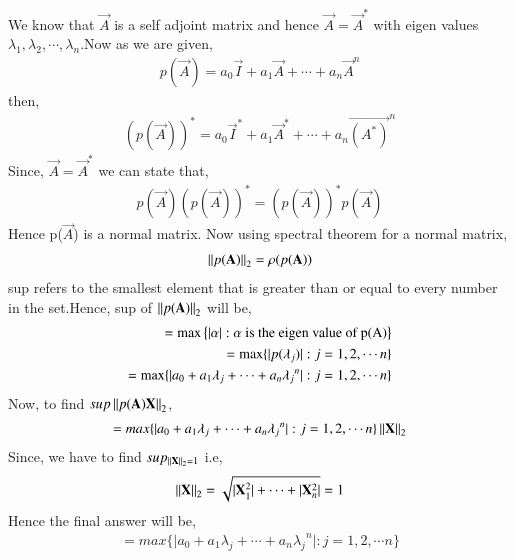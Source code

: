 We know that $\vec{A}$ is a self adjoint matrix and hence $\vec{A}=\vec{A}^{*}$ with eigen values $\lambda_1,\lambda_2,\cdots,\lambda_n$.Now as we are given,
\begin{align}
p(\vec{A})=a_0\vec{I}+a_1\vec{A}+\cdots+a_n\vec{A}^n
\end{align}
then,
\begin{align}
(p(\vec{A}))^{*}=a_0\vec{I}^{*}+a_1\vec{A}^{*}+\cdots+a_n\vec{(A^{*})}^n
\end{align}
Since, $\vec{A}=\vec{A}^{*}$ we can state that,
\begin{align}
p(\vec{A})(p(\vec{A}))^{*}=(p(\vec{A}))^{*}p(\vec{A})
\end{align}
Hence p($\vec{A}$) is a normal matrix. Now using spectral theorem for a normal matrix,
\begin{align}
\left\lVert p(\mathbf{A})\right\rVert_{2}=\rho{(p(\mathbf{A}))}\end{align}
sup refers to the smallest element that is greater than or equal to every number in the set.Hence, sup of $\left\lVert p(\mathbf{A})\right\rVert_{2}$ will be, 
\begin{align}
=\max\left\{\vert\alpha\vert: \alpha \text{ is the eigen value of p(A)}\right\}\\
=\max\{\vert p(\lambda_j)\vert:j=1, 2, \cdots n\}\\
=\max\{\vert a_0+a_1\lambda_j+\cdots+a_n{\lambda_j}^n\vert: j=1, 2, \cdots n\}
\end{align}
Now, to find $sup\left\lVert p(\mathbf{A})\mathbf{X}\right\rVert_{2}$,\begin{align}
=max\{\vert a_0+a_1\lambda_j+\cdots+a_n{\lambda_j}^n\vert: j=1, 2, \cdots n\}\left\lVert\mathbf{X}\right\rVert_2
\end{align}
Since, we have to find $sup_{\left\lVert\mathbf{X}\right\rVert_{2}=1}$ i.e,
\begin{align} \left\lVert\mathbf{X}\right\rVert_2=\sqrt{\vert\mathbf{X}_{1}^{2}\vert+\cdots+\vert\mathbf{X}_{n}^{2}\vert}=1\end{align} 
Hence the final answer will be,
\begin{align}
=max\{\vert a_0+a_1\lambda_j+\cdots+a_n{\lambda_j}^n\vert: j=1, 2, \cdots n\}
\end{align}

%
